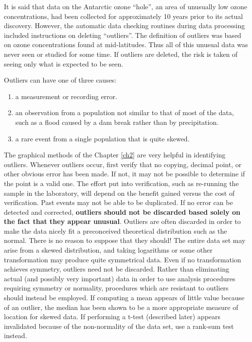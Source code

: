\documentclass[]{book}
\providecommand{\tightlist}{%
  \setlength{\itemsep}{0pt}\setlength{\parskip}{0pt}}
\begin{document}
It is said that data on the Antarctic ozone ``hole'', an area of unusually low ozone concentrations, had been collected for approximately 10 years prior to its actual discovery. However, the automatic data checking routines during data processing included instructions on deleting ``outliers''. The definition of outliers was based on ozone concentrations found at mid-latitudes. Thus all of this unusual data was never seen or studied for some time. If outliers are deleted, the risk is taken of seeing only what is expected to be seen.

Outliers can have one of three causes:

\begin{enumerate}
\def\labelenumi{\arabic{enumi}.}
\tightlist
\item
  a measurement or recording error.
\item
  an observation from a population not similar to that of most of the data, such as a flood caused by a dam break rather than by precipitation.
\item
  a rare event from a single population that is quite skewed.
\end{enumerate}

The graphical methods of the Chapter \ref{ch2} are very helpful in identifying outliers. Whenever outliers occur, first verify that no copying, decimal point, or other obvious error has been made. If not, it may not be possible to determine if the point is a valid one. The effort put into verification, such as re-running the sample in the laboratory, will depend on the benefit gained versus the cost of verification. Past events may not be able to be duplicated. If no error can be detected and corrected, \textbf{outliers should not be discarded based solely on the fact that they appear unusual}. Outliers are often discarded in order to make the data nicely fit a preconceived theoretical distribution such as the normal. There is no reason to suppose that they should! The entire data set may arise from a skewed distribution, and taking logarithms or some other transformation may produce quite symmetrical data. Even if no transformation achieves symmetry, outliers need not be discarded. Rather than eliminating actual (and possibly very important) data in order to use analysis procedures requiring symmetry or normality, procedures which are resistant to outliers should instead be employed. If computing a mean appears of little value because of an outlier, the median has been shown to be a more appropriate measure of location for skewed data. If performing a t-test (described later) appears invalidated because of the non-normality of the data set, use a rank-sum test instead.
\end{document}
